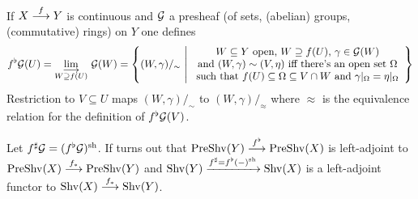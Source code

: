 \documentclass[a4paper,parskip=half,numbers=enddot, DIV=12]{scrreprt}
\begin{document}
    \begin{rem}
        If $X\morphism[f] Y$ is continuous and $\mathcal{G}$ a presheaf (of sets, (abelian) groups, (commutative) rings) on $Y$ one defines
        \begin{align*}
            f^\flat\Gg(U) = \colimit[W\supseteq f(U)] \Gg(W)=\left\{(W,\gamma)/_\sim\st
            \begin{array}{c}
	            W\subseteq Y\text{ open, }W\supseteq f(U)\text{, }\gamma\in \Gg(W)\\
	            \text{and }(W,\gamma)\sim (V,\eta)\text{ iff there's an open set }\Omega\\
	            \text{such that }f(U)\subseteq \Omega\subseteq V\cap W\text{ and }\gamma|_\Omega=\eta|_\Omega
            \end{array}\right\}
        \end{align*}
        Restriction to $V\subseteq U$ maps $(W,\gamma)/_\sim$ to $(W,\gamma)/_\approx$ where $\approx$ is the equivalence relation for the definition of $f^\flat \mathcal{G}(V)$. 
        
        Let $f^\sharp \mathcal{G}=(f^\flat\mathcal{G})^{\mathrm{sh}}$. If turns out that $\cat{PreShv}(Y)  \morphism[f^\flat] \cat{PreShv}(X)$ is left-adjoint to $\cat{PreShv}(X) \morphism[f_*] \cat{PreShv}(Y)$ and $\operatorname{Shv}(Y)  \xrightarrow{f^\sharp = f^\flat(-)^{\mathrm{sh}}} \operatorname{Shv}(X)$ is a left-adjoint functor to $\cat{Shv}(X) \morphism[f_*] \cat{Shv}(Y)$.
    \end{rem}
\end{document}
